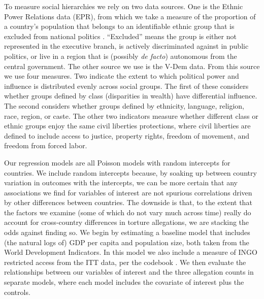 \documentclass[11pt]{article}
\begin{document}
To measure social hierarchies we rely on two data sources. One is the Ethnic Power Relations data (EPR), from which we take a measure of the proportion of a country's population that belongs to an identifiable ethnic group that is excluded from national politics \citep{vogt2015integrating}. ``Excluded'' means the group is either not represented in the executive branch, is actively discriminated against in public politics, or live in a region that is (possibly {\em de facto}) autonomous from the central government.  The other source we use is the V-Dem data. From this source we use four measures. Two indicate the extent to which political power and influence is distributed evenly across social groups. The first of these considers whether groups defined by class (disparities in wealth) have differential influence. The second considers whether groups defined by ethnicity, language, religion, race, region, or caste. The other two indicators measure whether different class or ethnic groups enjoy the same civil liberties protections, where civil liberties are defined to include access to justice, property rights, freedom of movement, and freedom from forced labor. 

Our regression models are all Poisson models with random intercepts for countries. We include random intercepts 
because, by soaking up between country variation in outcomes with the intercepts, we can be more certain that any associations we find for variables of interest are not spurious correlations driven by other differences between countries. The downside is that, to the extent that the factors we examine (some of which do not vary much across time) really do account for cross-country differences in torture allegations, we are stacking the odds against finding so. 
We begin by estimating a baseline model that includes (the natural logs of) GDP per capita and population size, both taken from the World Development Indicators. In this model we also include a measure of INGO restricted access from the ITT data, per the codebook \citep[][p.\ 17]{ITTsaguide}. We then evaluate the relationships between our variables of interest and the three allegation counts in separate models, where each model includes the covariate of interest plus the controls. 
\end{document}
